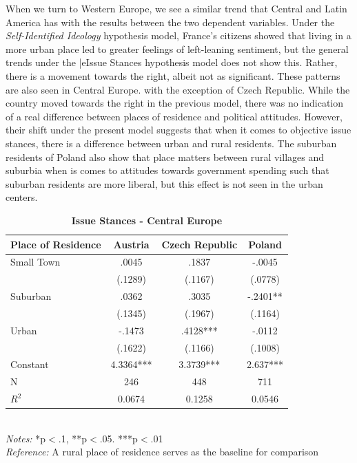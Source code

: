 \documentclass[12pt, titlepage]{article}
\newcommand\e{\emph}
\newcommand\tb{\textbf}
\begin{document}
When we turn to Western Europe, we see a similar trend that Central and Latin America has with the results between the two dependent variables. Under the \e{Self-Identified Ideology} hypothesis model, France's citizens showed that living in a more urban place led to greater feelings of left-leaning sentiment, but the general trends under the |e{Issue Stances} hypothesis model does not show this. Rather, there is a movement towards the right, albeit not as significant. These patterns are also seen in Central Europe. with the exception of Czech Republic. While the country moved towards the right in the previous model, there was no indication of a real difference between places of residence and political attitudes. However, their shift under the present model suggests that when it comes to objective issue stances, there is a difference between urban and rural residents. The suburban residents of Poland also show that place matters between rural villages and suburbia when is comes to attitudes towards government spending such that suburban residents are more liberal, but this effect is not seen in the urban centers.

\begin{singlespace}
	\begin{table}[H]
		\centering
		\caption{\tb{Issue Stances - Central Europe}}
		\begin{tabulary}{\linewidth}{l c c c }
			
			\hline
			\tb{Place of Residence} &\tb{Austria}&\tb{Czech Republic}& \tb{Poland} \\
			\hline
			Small Town &.0045 &.1837  &-.0045   \\
			&(.1289)&(.1167) &(.0778)  \\
			Suburban& .0362 &.3035  &-.2401**   \\
			&(.1345) &(.1967) &(.1164)\\
			Urban&-.1473&.4128***  &-.0112    \\
			&(.1622)& (.1166)  &(.1008)    \\
			Constant&4.3364*** &3.3739***  &2.637***     \\
			N&246 & 448  & 711   \\
			$R^2$&0.0674&0.1258  &0.0546  \\
			\hline 
\end{tabulary}
\\
\e{Notes:} *p$<$.1, **p$<$.05. ***p$<$.01 \\
\e{Reference:} A rural place of residence serves as the baseline for comparison
\label{CELib}
\end{table}
\end{singlespace}
\end{document}
